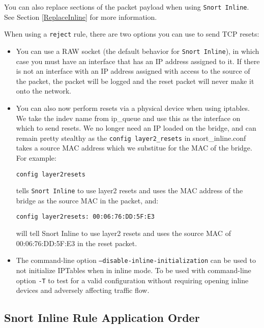 \documentclass[english]{report}
\newenvironment{note}{
\samepage
    \vspace{10pt}{\textsf{
        {\hspace{7pt}\Huge{$\triangle$\hspace{-12.5pt}{\Large{$^!$}}}}\hspace{5pt}
        {\Large{NOTE}}
    }
    }
   \begin{center}
    \par\vspace{-17pt}

    \begin{lrbox}{\savepar}
    \begin{minipage}[r]{6in}
}
{
    \end{minipage}
    \end{lrbox}
    \fbox{
        \usebox{
            \savepar
	}
    }
    \par\vskip10pt
    \end{center}
}
\newenvironment{note}{
        \begin{rawhtml}
        <p><table border="1"><tr><td><b>
        Note:&nbsp;&nbsp;</b>
        \end{rawhtml}
}{
        \begin{rawhtml}
        </b></td></tr></table></p>
        \end{rawhtml}
}
\begin{document}
\begin{note}
You can also replace sections of the packet payload when using \texttt{Snort Inline}.
See Section \ref{ReplaceInline} for more information.
\end{note}

When using a \texttt{reject} rule, there are two options you can use to send
TCP resets:
\begin{itemize}

\item You can use a RAW socket (the default behavior for \texttt{Snort Inline}), in which case you must have an interface that has an IP address assigned to it. If there is not an interface with an IP address assigned with access to the source of the packet, the packet will be logged and the reset packet will never make it onto the network.

\item You can also now perform resets via a physical device when using iptables.  We take the indev name from ip\_queue and use this as the interface on which to send resets. We no longer need an IP loaded on the bridge, and can remain pretty stealthy as the \texttt{config layer2\_resets} in snort\_inline.conf takes a source MAC address which we substitue for the MAC of the bridge. For example:
\begin{verbatim}
config layer2resets
\end{verbatim}
tells \texttt{Snort Inline} to use layer2 resets and uses the MAC address of the bridge as the source MAC in the packet, and:
\begin{verbatim}
config layer2resets: 00:06:76:DD:5F:E3  
\end{verbatim}
will tell Snort Inline to use layer2 resets and uses the source MAC of 
00:06:76:DD:5F:E3 in the reset packet.

\item The command-line option \texttt{--disable-inline-initialization} can be
used to not initialize IPTables when in inline mode.  To be used with
command-line option \texttt{-T} to test for a valid configuration without
requiring opening inline devices and adversely affecting traffic flow.

\end{itemize}

\subsection{Snort Inline Rule Application Order\label{InlineRuleOrder}}
\end{document}

